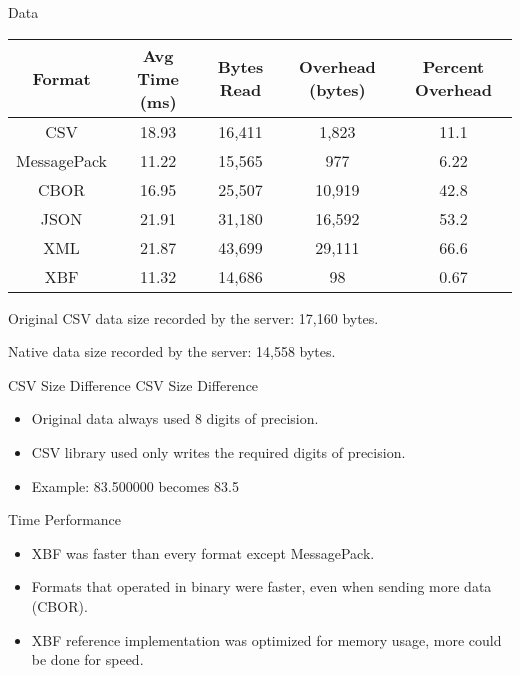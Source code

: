 \documentclass{beamer}
\begin{document}
\begin{frame}[fragile]{Data}
	\begin{center}
		\begin{tabular}{|c|c|c|c|c|}
			\hline
			\textbf{Format} & \textbf{Avg Time (ms)} & \textbf{Bytes Read} & \textbf{Overhead (bytes)} & \textbf{Percent Overhead} \\
			\hline
			CSV             & 18.93                  & 16,411              & 1,823                     & 11.1                      \\
			MessagePack     & 11.22                  & 15,565              & 977                       & 6.22                      \\
			CBOR            & 16.95                  & 25,507              & 10,919                    & 42.8                      \\
			JSON            & 21.91                  & 31,180              & 16,592                    & 53.2                      \\
			XML             & 21.87                  & 43,699              & 29,111                    & 66.6                      \\
			XBF             & 11.32                  & 14,686              & 98                        & 0.67                      \\
			\hline
		\end{tabular}
	\end{center}
	Original CSV data size recorded by the server: 17,160 bytes.

	Native data size recorded by the server: 14,558 bytes.
\end{frame}

\begin{frame}{CSV Size Difference}
	CSV Size Difference
	\begin{itemize}
		\item Original data always used 8 digits of precision.
		\item CSV library used only writes the required digits of precision.
		\item Example: 83.500000 becomes 83.5
	\end{itemize}
\end{frame}

\begin{frame}{Time Performance}
	\begin{itemize}
		\item XBF was faster than every format except MessagePack.
		\item Formats that operated in binary were faster, even when sending more data (CBOR).
		\item XBF reference implementation was optimized for memory usage, more could be done for speed.
	\end{itemize}
\end{frame}
\end{document}
